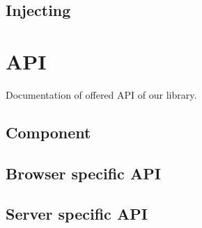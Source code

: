   \subsection{Injecting}\label{subsec:our-architecture-injecting}

\section{API}\label{sec:our-api}

  Documentation of offered API of our library.

  \subsection{Component}\label{subsec:our-api-component}
  \subsection{Browser specific API}\label{subsec:our-api-browser}
  \subsection{Server specific API}\label{subsec:our-api-server}
